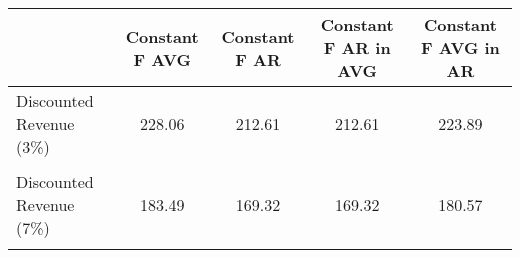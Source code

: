 \begin{tabular}{l*{4}{c}}
\hline\hline
                &Constant F AVG&Constant F AR&Constant F AR in AVG&Constant F AVG in AR\\
\hline
Discounted Revenue (3\%)&   228.06&   212.61&   212.61&   223.89\\
                &         &         &         &         \\
Discounted Revenue (7\%)&   183.49&   169.32&   169.32&   180.57\\
                &         &         &         &         \\
\hline\hline
\end{tabular}
